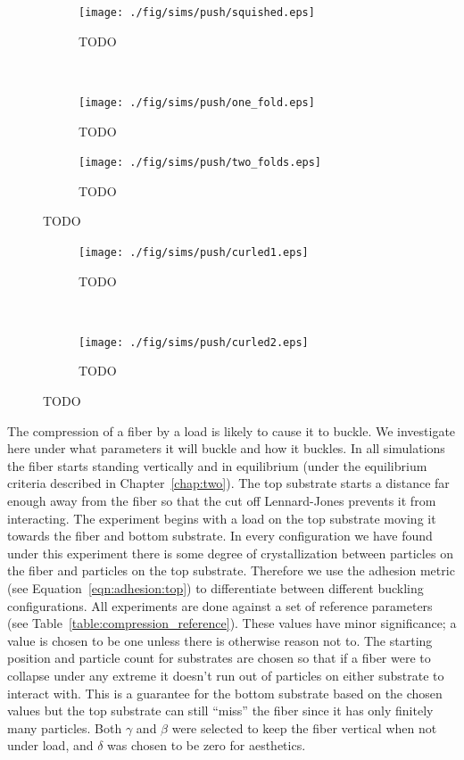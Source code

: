 	\begin{figure}
		\centering
		\begin{subfigure}{.5\textwidth}
			\centering
			\texttt{[image: ./fig/sims/push/squished.eps]}
			\caption{TODO\label{subfig:push_squished}}
		\end{subfigure}%
		~
		\begin{subfigure}{.5\textwidth}
			\centering
			\texttt{[image: ./fig/sims/push/one\_fold.eps]}
			\caption{TODO \label{subfig:push_one_fold}}
		\end{subfigure}

		\begin{subfigure}{.5\textwidth}
			\centering
			\texttt{[image: ./fig/sims/push/two\_folds.eps]}
			\caption{TODO\label{subfig:push_two_folds}}
		\end{subfigure}
		\caption{TODO\label{fig:push_fold}}
	\end{figure}

	\begin{figure}
		\centering
		\begin{subfigure}{.5\textwidth}
			\centering
			\texttt{[image: ./fig/sims/push/curled1.eps]}
			\caption{TODO \label{subfig:push_curled1}}
		\end{subfigure}%
		~
		\begin{subfigure}{.5\textwidth}
			\centering
			\texttt{[image: ./fig/sims/push/curled2.eps]}
			\caption{TODO\label{subfig:push_curled2}}
		\end{subfigure}
		\caption{TODO\label{fig:push_curled}}
	\end{figure}

The compression of a fiber by a load is likely to cause it to buckle. We investigate here under what parameters it will buckle and how it buckles. In all simulations the fiber starts standing vertically and in equilibrium (under the equilibrium criteria described in Chapter~\ref{chap:two}). The top substrate starts a distance far enough away from the fiber so that the cut off Lennard-Jones prevents it from interacting. The experiment begins with a load on the top substrate moving it towards the fiber and bottom substrate. In every configuration we have found under this experiment there is some degree of crystallization between particles on the fiber and particles on the top substrate. Therefore we use the adhesion metric (see Equation~\ref{eqn:adhesion:top}) to differentiate between different buckling configurations. All experiments are done against a set of reference parameters (see Table~\ref{table:compression_reference}). These values have minor significance; a value is chosen to be one unless there is otherwise reason not to. The starting position and particle count for substrates are chosen so that if a fiber were to collapse under any extreme it doesn't run out of particles on either substrate to interact with. This is a guarantee for the bottom substrate based on the chosen values but the top substrate can still ``miss'' the fiber since it has only finitely many particles. Both $\gamma$ and $\beta$ were selected to keep the fiber vertical when not under load, and $\delta$ was chosen to be zero for aesthetics.

